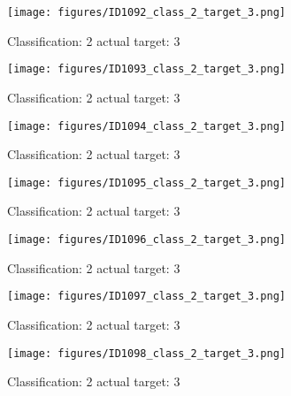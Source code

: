 \begin{figure}[h!]
\begin{center}
\texttt{[image: figures/ID1092\_class\_2\_target\_3.png]}
\end{center}
\caption{ Classification: 2 actual target: 3}
\label{fig:ID1092_class_2_target_3}
\end{figure}
\begin{figure}[h!]
\begin{center}
\texttt{[image: figures/ID1093\_class\_2\_target\_3.png]}
\end{center}
\caption{ Classification: 2 actual target: 3}
\label{fig:ID1093_class_2_target_3}
\end{figure}
\begin{figure}[h!]
\begin{center}
\texttt{[image: figures/ID1094\_class\_2\_target\_3.png]}
\end{center}
\caption{ Classification: 2 actual target: 3}
\label{fig:ID1094_class_2_target_3}
\end{figure}
\begin{figure}[h!]
\begin{center}
\texttt{[image: figures/ID1095\_class\_2\_target\_3.png]}
\end{center}
\caption{ Classification: 2 actual target: 3}
\label{fig:ID1095_class_2_target_3}
\end{figure}
\begin{figure}[h!]
\begin{center}
\texttt{[image: figures/ID1096\_class\_2\_target\_3.png]}
\end{center}
\caption{ Classification: 2 actual target: 3}
\label{fig:ID1096_class_2_target_3}
\end{figure}
\begin{figure}[h!]
\begin{center}
\texttt{[image: figures/ID1097\_class\_2\_target\_3.png]}
\end{center}
\caption{ Classification: 2 actual target: 3}
\label{fig:ID1097_class_2_target_3}
\end{figure}
\begin{figure}[h!]
\begin{center}
\texttt{[image: figures/ID1098\_class\_2\_target\_3.png]}
\end{center}
\caption{ Classification: 2 actual target: 3}
\label{fig:ID1098_class_2_target_3}
\end{figure}
